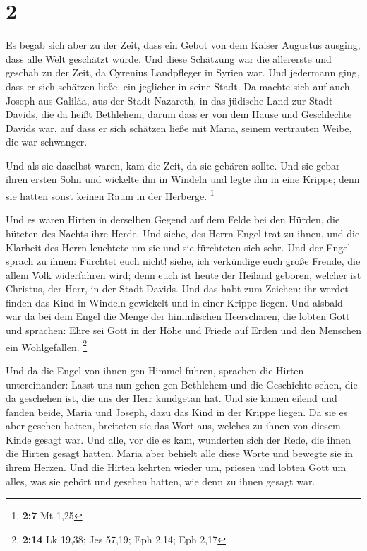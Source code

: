 \hypertarget{section-1}{%
\section{2}\label{section-1}}

 Es begab sich aber zu der Zeit, dass ein Gebot von dem
Kaiser Augustus ausging, dass alle Welt geschätzt würde. 
Und diese Schätzung war die allererste und geschah zu der Zeit, da
Cyrenius Landpfleger in Syrien war.  Und jedermann ging,
dass er sich schätzen ließe, ein jeglicher in seine Stadt. 
Da machte sich auf auch Joseph aus Galiläa, aus der Stadt Nazareth, in
das jüdische Land zur Stadt Davids, die da heißt Bethlehem, darum dass
er von dem Hause und Geschlechte Davids war,  auf dass er
sich schätzen ließe mit Maria, seinem vertrauten Weibe, die war
schwanger.

 Und als sie daselbst waren, kam die Zeit, da sie gebären
sollte.  Und sie gebar ihren ersten Sohn und wickelte ihn in
Windeln und legte ihn in eine Krippe; denn sie hatten sonst keinen Raum
in der Herberge. \footnote{\textbf{2:7} Mt 1,25}

 Und es waren Hirten in derselben Gegend auf dem Felde bei
den Hürden, die hüteten des Nachts ihre Herde.  Und siehe,
des Herrn Engel trat zu ihnen, und die Klarheit des Herrn leuchtete um
sie und sie fürchteten sich sehr.  Und der Engel sprach zu
ihnen: Fürchtet euch nicht! siehe, ich verkündige euch große Freude, die
allem Volk widerfahren wird;  denn euch ist heute der
Heiland geboren, welcher ist Christus, der Herr, in der Stadt Davids.
 Und das habt zum Zeichen: ihr werdet finden das Kind in
Windeln gewickelt und in einer Krippe liegen.  Und alsbald
war da bei dem Engel die Menge der himmlischen Heerscharen, die lobten
Gott und sprachen:  Ehre sei Gott in der Höhe und Friede
auf Erden und den Menschen ein Wohlgefallen. \footnote{\textbf{2:14} Lk
  19,38; Jes 57,19; Eph 2,14; Eph 2,17}

 Und da die Engel von ihnen gen Himmel fuhren, sprachen die
Hirten untereinander: Lasst uns nun gehen gen Bethlehem und die
Geschichte sehen, die da geschehen ist, die uns der Herr kundgetan hat.
 Und sie kamen eilend und fanden beide, Maria und Joseph,
dazu das Kind in der Krippe liegen.  Da sie es aber gesehen
hatten, breiteten sie das Wort aus, welches zu ihnen von diesem Kinde
gesagt war.  Und alle, vor die es kam, wunderten sich der
Rede, die ihnen die Hirten gesagt hatten.  Maria aber
behielt alle diese Worte und bewegte sie in ihrem Herzen. 
Und die Hirten kehrten wieder um, priesen und lobten Gott um alles, was
sie gehört und gesehen hatten, wie denn zu ihnen gesagt war.

